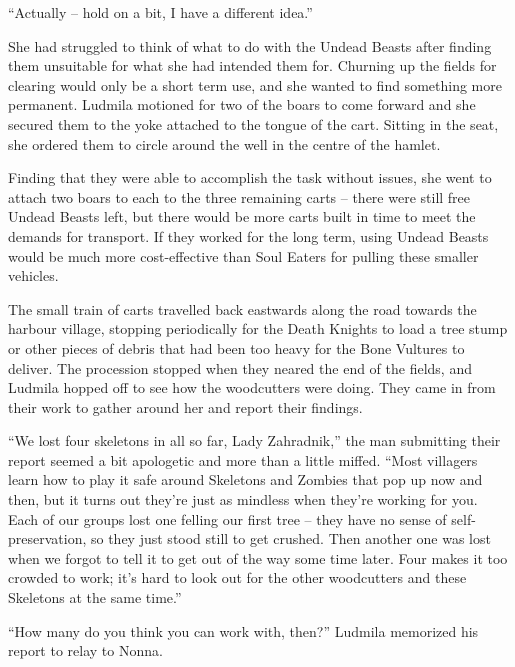  

“Actually – hold on a bit, I have a different idea.”

 

She had struggled to think of what to do with the Undead Beasts after finding them unsuitable for what she had intended them for. Churning up the fields for clearing would only be a short term use, and she wanted to find something more permanent. Ludmila motioned for two of the boars to come forward and she secured them to the yoke attached to the tongue of the cart. Sitting in the seat, she ordered them to circle around the well in the centre of the hamlet.

 

Finding that they were able to accomplish the task without issues, she went to attach two boars to each to the three remaining carts – there were still free Undead Beasts left, but there would be more carts built in time to meet the demands for transport. If they worked for the long term, using Undead Beasts would be much more cost-effective than Soul Eaters for pulling these smaller vehicles.

 

The small train of carts travelled back eastwards along the road towards the harbour village, stopping periodically for the Death Knights to load a tree stump or other pieces of debris that had been too heavy for the Bone Vultures to deliver. The procession stopped when they neared the end of the fields, and Ludmila hopped off to see how the woodcutters were doing. They came in from their work to gather around her and report their findings.

 

“We lost four skeletons in all so far, Lady Zahradnik,” the man submitting their report seemed a bit apologetic and more than a little miffed. “Most villagers learn how to play it safe around Skeletons and Zombies that pop up now and then, but it turns out they’re just as mindless when they’re working for you. Each of our groups lost one felling our first tree – they have no sense of self-preservation, so they just stood still to get crushed. Then another one was lost when we forgot to tell it to get out of the way some time later. Four makes it too crowded to work; it’s hard to look out for the other woodcutters and these Skeletons at the same time.”

 

“How many do you think you can work with, then?” Ludmila memorized his report to relay to Nonna.

